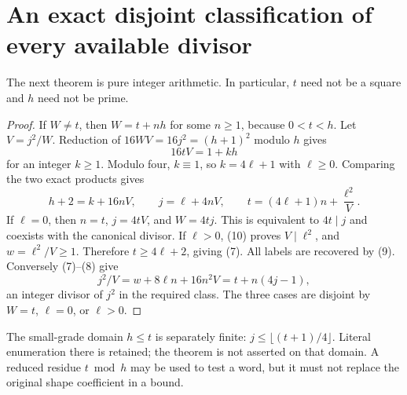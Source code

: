 \section{An exact disjoint classification of every available divisor}
The next theorem is pure integer arithmetic. In particular, $t$ need not be a
square and $h$ need not be prime.

\begin{proof}
If $W\ne t$, then $W=t+nh$ for some $n\ge1$, because $0<t<h$. Let $V=j^2/W$.
Reduction of $16WV=16j^2=(h+1)^2$ modulo $h$ gives
\[
 16tV=1+kh
\]
for an integer $k\ge1$. Modulo four, $k\equiv1$, so $k=4\ell+1$ with
$\ell\ge0$. Comparing the two exact products gives
\[
 h+2=k+16nV,\qquad j=\ell+4nV,
 \qquad t=(4\ell+1)n+\frac{\ell^2}{V}.                  \tag{10}
\]
If $\ell=0$, then $n=t$, $j=4tV$, and $W=4tj$. This is equivalent to
$4t\mid j$ and coexists with the canonical divisor. If $\ell>0$, (10) proves
$V\mid\ell^2$, and $w=\ell^2/V\ge1$. Therefore $t\ge4\ell+2$, giving (7).
All labels are recovered by (9). Conversely (7)--(8) give
\[
 j^2/V=w+8\ell n+16n^2V=t+n(4j-1),
\]
an integer divisor of $j^2$ in the required class. The three cases are disjoint
by $W=t$, $\ell=0$, or $\ell>0$.
\end{proof}

The small-grade domain $h\le t$ is separately finite:
$j\le\lfloor(t+1)/4\rfloor$. Literal enumeration there is retained; the theorem
is not asserted on that domain. A reduced residue $t\bmod h$ may be used to test
a word, but it must not replace the original shape coefficient in a bound.

